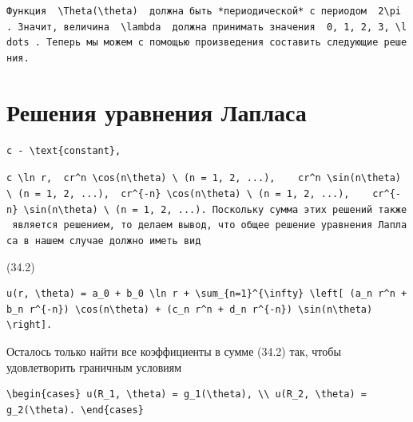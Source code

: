 \documentclass[
  ukrainian,
]{article}
\begin{document}
\texttt{Функция\ \ \textquotesingle{}\textbackslash{}Theta(\textbackslash{}theta)\textquotesingle{}\ \ должна\ быть\ *периодической*\ с\ периодом\ \ \textquotesingle{}2\textbackslash{}pi\textquotesingle{}\ .\ Значит,\ величина\ \ \textquotesingle{}\textbackslash{}lambda\textquotesingle{}\ \ должна\ принимать\ значения\ \ \textquotesingle{}0,\ 1,\ 2,\ 3,\ \textbackslash{}ldots\textquotesingle{}\ .\ Теперь\ мы\ можем\ с\ помощью\ произведения\ составить\ следующие\ решения.}

\section{Решения уравнения
Лапласа}\label{ux440ux435ux448ux435ux43dux438ux44f-ux443ux440ux430ux432ux43dux435ux43dux438ux44f-ux43bux430ux43fux43bux430ux441ux430}

\begin{verbatim}
c - \text{constant},
\end{verbatim}

\texttt{\textquotesingle{}c\ \textbackslash{}ln\ r,\textquotesingle{}\ \ \textquotesingle{}cr\^{}n\ \textbackslash{}cos(n\textbackslash{}theta)\ \textbackslash{}\ (n\ =\ 1,\ 2,\ ...),\textquotesingle{}\ \ \ \ \textquotesingle{}cr\^{}n\ \textbackslash{}sin(n\textbackslash{}theta)\ \textbackslash{}\ (n\ =\ 1,\ 2,\ ...),\textquotesingle{}\ \ \textquotesingle{}cr\^{}\{-n\}\ \textbackslash{}cos(n\textbackslash{}theta)\ \textbackslash{}\ (n\ =\ 1,\ 2,\ ...),\textquotesingle{}\ \ \ \ \textquotesingle{}cr\^{}\{-n\}\ \textbackslash{}sin(n\textbackslash{}theta)\ \textbackslash{}\ (n\ =\ 1,\ 2,\ ...).\textquotesingle{}\ Поскольку\ сумма\ этих\ решений\ также\ является\ решением,\ то\ делаем\ вывод,\ что\ общее\ решение\ уравнения\ Лапласа\ в\ нашем\ случае\ должно\ иметь\ вид}

(34.2)

\begin{verbatim}
u(r, \theta) = a_0 + b_0 \ln r + \sum_{n=1}^{\infty} \left[ (a_n r^n + b_n r^{-n}) \cos(n\theta) + (c_n r^n + d_n r^{-n}) \sin(n\theta) \right].
\end{verbatim}

Осталось только найти все коэффициенты в сумме (34.2) так, чтобы
удовлетворить граничным условиям

\begin{verbatim}
\begin{cases} u(R_1, \theta) = g_1(\theta), \\ u(R_2, \theta) = g_2(\theta). \end{cases}
\end{verbatim}
\end{document}
